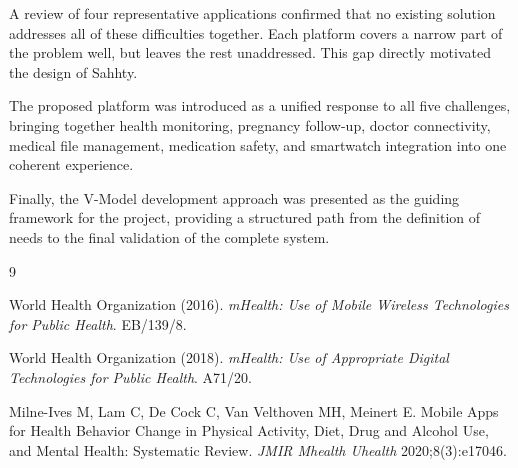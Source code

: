A review of four representative applications confirmed that no existing solution addresses
all of these difficulties together. Each platform covers a narrow part of the problem well,
but leaves the rest unaddressed. This gap directly motivated the design of Sahhty.

The proposed platform was introduced as a unified response to all five challenges, bringing
together health monitoring, pregnancy follow-up, doctor connectivity, medical file
management, medication safety, and smartwatch integration into one coherent experience.

Finally, the V-Model development approach was presented as the guiding framework for the
project, providing a structured path from the definition of needs to the final validation of
the complete system.




\begin{thebibliography}{9}

World Health Organization (2016).
\textit{mHealth: Use of Mobile Wireless Technologies for Public Health}.
EB/139/8.

World Health Organization (2018).
\textit{mHealth: Use of Appropriate Digital Technologies for Public Health}.
A71/20.

Milne-Ives M, Lam C, De Cock C, Van Velthoven MH, Meinert E.
Mobile Apps for Health Behavior Change in Physical Activity, Diet, Drug and Alcohol
Use, and Mental Health: Systematic Review.
\textit{JMIR Mhealth Uhealth} 2020;8(3):e17046.

\end{thebibliography}